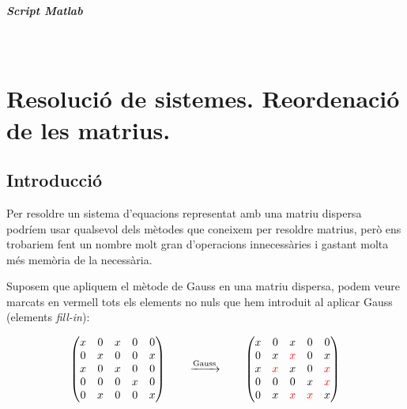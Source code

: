 \documentclass[11pt,a4paper,twoside]{report}
\begin{document}
 \paragraph*{Script Matlab} \mbox{} \\


\chapter{Resolució de sistemes. Reordenació de les matrius.}

\section{Introducció}

Per resoldre un sistema d'equacions representat amb una matriu dispersa podríem usar qualsevol dels mètodes que coneixem per resoldre matrius, però ens trobariem fent un nombre molt gran d'operacions innecessàries i gastant molta més memòria de la necessària. \newline

Suposem que apliquem el mètode de Gauss en una matriu dispersa, podem veure marcats en vermell tots els elements no nuls que hem introduit al aplicar Gauss (elements \textit{fill-in}):

\[
\begin{pmatrix}
  	x & 0 & x & 0 & 0\\
  	0 & x & 0 & 0 & x\\
  	x & 0 & x & 0 & 0\\
  	0 & 0 & 0 & x & 0\\
  	0 & x & 0 & 0 & x\\
\end{pmatrix} \qquad \xrightarrow{\text{Gauss}} \qquad
\begin{pmatrix}
  	x & 0 & x & 0 & 0\\
  	0 & x & \textcolor{red}{x} & 0 & x\\
  	x & \textcolor{red}{x} & x & 0 & \textcolor{red}{x}\\
  	0 & 0 & 0 & x & \textcolor{red}{x}\\
  	0 & x & \textcolor{red}{x} & \textcolor{red}{x} & x\\
\end{pmatrix}
\]

\end{document}
